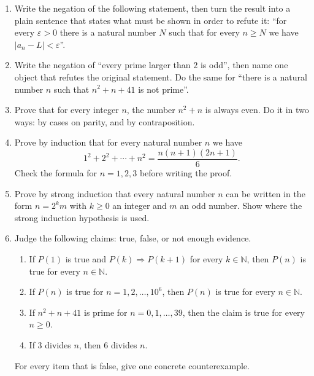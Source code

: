\begin{latihan}
\begin{enumerate}
  \item Write the negation of the following statement, then turn the result into a
        plain sentence that states what must be shown in order to
        refute it: ``for every $\varepsilon > 0$ there is a natural number $N$
        such that for every $n \geq N$ we have $|a_{n} - L| < \varepsilon$''.

  \item Write the negation of ``every prime larger than $2$ is
        odd'', then name one object that refutes the original statement.
        Do the same for ``there is a natural number $n$ such that
        $n^{2}+n+41$ is not prime''.

  \item Prove that for every integer $n$, the number $n^{2}+n$ is always
        even. Do it in two ways: by cases on parity, and by contraposition.

  \item Prove by induction that for every natural number $n$ we have
        \[
          1^{2} + 2^{2} + \cdots + n^{2} = \frac{n(n+1)(2n+1)}{6}.
        \]
        Check the formula for $n = 1, 2, 3$ before writing the proof.

  \item Prove by strong induction that every natural number $n$ can be written
        in the form $n = 2^{k}m$ with $k \geq 0$ an integer and $m$ an odd
        number. Show where the strong induction hypothesis is used.

  \item Judge the following claims: true, false, or not enough evidence.
        \begin{enumerate}
          \item If $P(1)$ is true and $P(k) \Rightarrow P(k+1)$ for every
                $k \in \mathbb{N}$, then $P(n)$ is true for every $n \in
                \mathbb{N}$.
          \item If $P(n)$ is true for $n = 1, 2, \dots, 10^{6}$, then $P(n)$ is true
                for every $n \in \mathbb{N}$.
          \item If $n^{2}+n+41$ is prime for $n = 0, 1, \dots, 39$, then the claim
                is true for every $n \geq 0$.
          \item If $3$ divides $n$, then $6$ divides $n$.
        \end{enumerate}
        For every item that is false, give one concrete counterexample.


\end{enumerate}
\end{latihan}
